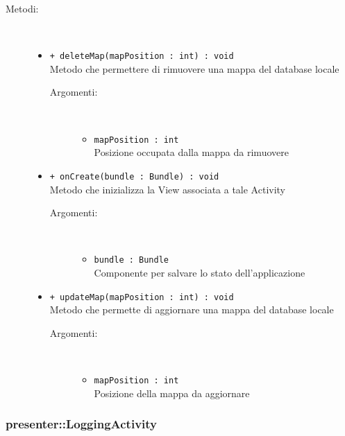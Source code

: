 \documentclass[../DefinizioneDiProdotto.tex]{subfiles}
\begin{document}
\begin{description}
\begin{itemize}
\end{itemize}
\item[Metodi:] \
\begin{itemize}
\item \texttt{+ deleteMap(mapPosition : int) : void}\\
Metodo che permettere di rimuovere una mappa del database locale
 \begin{description}
\item[Argomenti:] \
\begin{itemize}
\item \texttt{mapPosition : int}\\
Posizione occupata dalla mappa da rimuovere\end{itemize}
\end{description}
\item \texttt{+ onCreate(bundle : Bundle) : void}\\
Metodo che inizializza la View associata a tale Activity
 \begin{description}
\item[Argomenti:] \
\begin{itemize}
\item \texttt{bundle : Bundle}\\
Componente per salvare lo stato dell'applicazione\end{itemize}
\end{description}
\item \texttt{+ updateMap(mapPosition : int) : void}\\
Metodo che permette di aggiornare una mappa del database locale
 \begin{description}
\item[Argomenti:] \
\begin{itemize}
\item \texttt{mapPosition : int}\\
Posizione della mappa da aggiornare\end{itemize}
\end{description}
\end{itemize}
\end{description}

\subsubsection{presenter::LoggingActivity}
\end{document}
